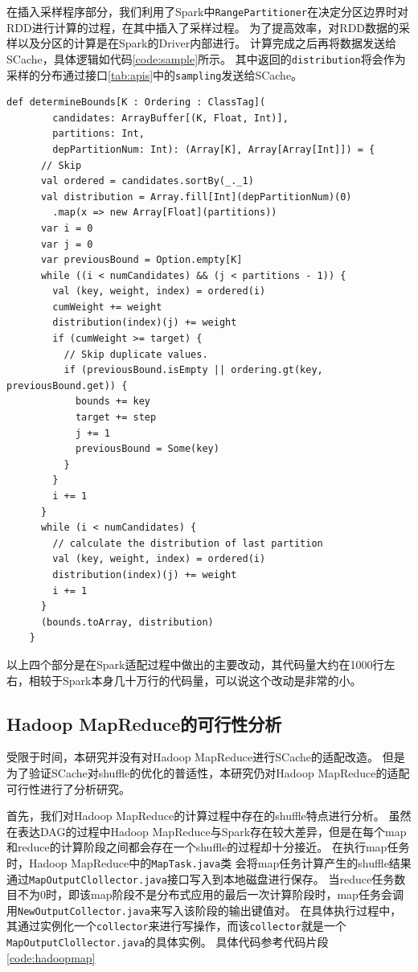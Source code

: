 在插入采样程序部分，我们利用了Spark中\verb|RangePartitioner|在决定分区边界时对RDD进行计算的过程，在其中插入了采样过程。
为了提高效率，对RDD数据的采样以及分区的计算是在Spark的Driver内部进行。
计算完成之后再将数据发送给SCache，具体逻辑如代码\ref{code:sample}所示。
其中返回的\verb|distribution|将会作为采样的分布通过接口\ref{tab:apis}中的\verb|sampling|发送给SCache。

\begin{lstlisting}[style={myScalastyle}, caption={水塘采样代码片段}, label={code:sample}]
    def determineBounds[K : Ordering : ClassTag](
        candidates: ArrayBuffer[(K, Float, Int)],
        partitions: Int,
        depPartitionNum: Int): (Array[K], Array[Array[Int]]) = {
      // Skip
      val ordered = candidates.sortBy(_._1)
      val distribution = Array.fill[Int](depPartitionNum)(0)
        .map(x => new Array[Float](partitions))
      var i = 0
      var j = 0
      var previousBound = Option.empty[K]
      while ((i < numCandidates) && (j < partitions - 1)) {
        val (key, weight, index) = ordered(i)
        cumWeight += weight
        distribution(index)(j) += weight
        if (cumWeight >= target) {
          // Skip duplicate values.
          if (previousBound.isEmpty || ordering.gt(key, previousBound.get)) {
            bounds += key
            target += step
            j += 1
            previousBound = Some(key)
          }
        }
        i += 1
      }
      while (i < numCandidates) {
        // calculate the distribution of last partition
        val (key, weight, index) = ordered(i)
        distribution(index)(j) += weight
        i += 1
      }
      (bounds.toArray, distribution)
    }
\end{lstlisting}

以上四个部分是在Spark适配过程中做出的主要改动，其代码量大约在1000行左右，相较于Spark本身几十万行的代码量，可以说这个改动是非常的小。

\subsection{Hadoop MapReduce的可行性分析}

受限于时间，本研究并没有对Hadoop MapReduce进行SCache的适配改造。
但是为了验证SCache对shuffle的优化的普适性，本研究仍对Hadoop MapReduce的适配可行性进行了分析研究。

首先，我们对Hadoop MapReduce的计算过程中存在的shuffle特点进行分析。
虽然在表达DAG的过程中Hadoop MapReduce与Spark存在较大差异，但是在每个map和reduce的计算阶段之间都会存在一个shuffle的过程却十分接近。
在执行map任务时，Hadoop MapReduce中的\verb|MapTask.java|类
会将map任务计算产生的shuffle结果通过\verb|MapOutputClollector.java|接口写入到本地磁盘进行保存。
当reduce任务数目不为0时，即该map阶段不是分布式应用的最后一次计算阶段时，map任务会调用\verb|NewOutputCollector.java|来写入该阶段的输出键值对。
在具体执行过程中，其通过实例化一个\verb|collector|来进行写操作，而该\verb|collector|就是一个\verb|MapOutputClollector.java|的具体实例。
具体代码参考代码片段\ref{code:hadoopmap}

